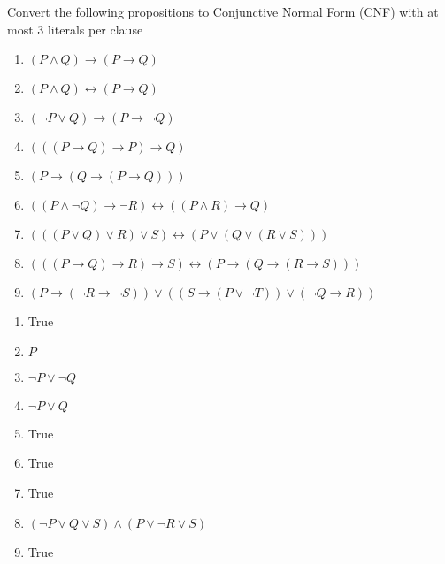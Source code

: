 \documentclass[10.5pt]{article}
\newenvironment{solution}[2][Solution]{ \begin{trivlist}
\item[\hskip \labelsep {\bfseries #1}]}{\end{trivlist}}
\newenvironment{problem}[2][Problem]{\begin{trivlist}
\item[\hskip \labelsep {\bfseries #1}\hskip \labelsep {\bfseries #2.}]}{\end{trivlist}}
\begin{document}
\vskip 0.5in
\pagebreak
\begin{problem}{6}Convert the following propositions to Conjunctive Normal Form (CNF) with at most 3 literals per clause
\begin{enumerate}
  \parskip=0in
  \parsep=0in
  \itemsep=0in
\item $(P \wedge Q) \rightarrow (P \rightarrow Q)$
\item $(P \wedge Q) \leftrightarrow (P \rightarrow Q)$
\item $(\lnot P \vee Q) \rightarrow (P \rightarrow \lnot Q)$
\item $(((P \rightarrow Q) \rightarrow P) \rightarrow Q)$
\item $(P \rightarrow (Q \rightarrow (P \rightarrow Q)))$
\item $((P \wedge \lnot Q) \rightarrow \lnot R) \leftrightarrow ((P \wedge R) \rightarrow Q)$
\item $(((P \vee Q) \vee R) \vee S) \leftrightarrow (P \vee (Q \vee (R \vee S)))$
\item $(((P \rightarrow Q) \rightarrow R) \rightarrow S) \leftrightarrow (P \rightarrow (Q \rightarrow (R \rightarrow S)))$
\item $(P \rightarrow (\lnot R \rightarrow \lnot S)) \vee ((S \rightarrow (P \vee \lnot T)) \vee (\lnot Q \rightarrow R))$
\end{enumerate}
\end{problem}
\begin{solution}{6}
\item[]
\begin{enumerate}
  \parskip=0in
  \parsep=0in
  \itemsep=0in
\item True
\item $P$
\item $\lnot P \vee \lnot Q$
\item $\lnot P \vee Q$
\item True
\item True
\item True
\item $(\lnot P \vee Q \vee S) \wedge (P \vee \lnot R \vee S)$
\item True
\end{enumerate}
\end{solution}
\end{document}
